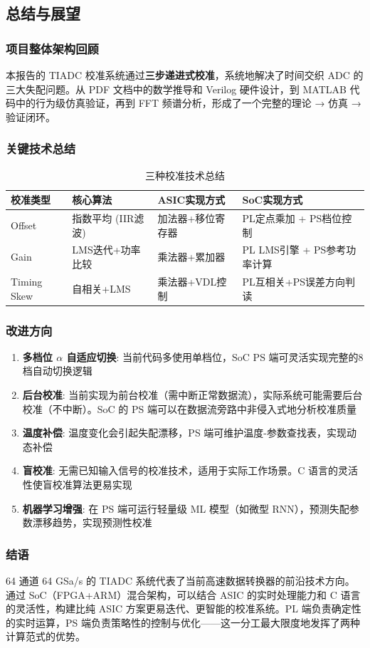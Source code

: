 \documentclass[UTF8,a4paper,11pt]{ctexart}
\begin{document}
\subsection{总结与展望}
\label{sec:conclusion}

\subsubsection{项目整体架构回顾}

本报告的 TIADC 校准系统通过\textbf{三步递进式校准}，系统地解决了时间交织 ADC 的三大失配问题。从 PDF 文档中的数学推导和 Verilog 硬件设计，到 MATLAB 代码中的行为级仿真验证，再到 FFT 频谱分析，形成了一个完整的理论 → 仿真 → 验证闭环。

\subsubsection{关键技术总结}

\begin{table}[ht]
\centering
\caption{三种校准技术总结}
\begin{tabular}{p{2cm}p{2.5cm}p{2.5cm}p{3.5cm}}
\toprule
\textbf{校准类型} & \textbf{核心算法} & \textbf{ASIC实现方式} & \textbf{SoC实现方式} \\
\midrule
Offset & 指数平均 (IIR滤波) & 加法器+移位寄存器 & PL定点乘加 + PS档位控制 \\
Gain & LMS迭代+功率比较 & 乘法器+累加器 & PL LMS引擎 + PS参考功率计算 \\
Timing Skew & 自相关+LMS & 乘法器+VDL控制 & PL互相关+PS误差方向判读 \\
\bottomrule
\end{tabular}
\end{table}

\subsubsection{改进方向}

\begin{enumerate}
    \item \textbf{多档位 $\alpha$ 自适应切换}: 当前代码多使用单档位，SoC PS 端可灵活实现完整的8档自动切换逻辑
    \item \textbf{后台校准}: 当前实现为前台校准（需中断正常数据流），实际系统可能需要后台校准（不中断）。SoC 的 PS 端可以在数据流旁路中非侵入式地分析校准质量
    \item \textbf{温度补偿}: 温度变化会引起失配漂移，PS 端可维护温度-参数查找表，实现动态补偿
    \item \textbf{盲校准}: 无需已知输入信号的校准技术，适用于实际工作场景。C 语言的灵活性使盲校准算法更易实现
    \item \textbf{机器学习增强}: 在 PS 端可运行轻量级 ML 模型（如微型 RNN），预测失配参数漂移趋势，实现预测性校准
\end{enumerate}

\subsubsection{结语}

64 通道 64 GSa/s 的 TIADC 系统代表了当前高速数据转换器的前沿技术方向。通过 SoC（FPGA+ARM）混合架构，可以结合 ASIC 的实时处理能力和 C 语言的灵活性，构建比纯 ASIC 方案更易迭代、更智能的校准系统。PL 端负责确定性的实时运算，PS 端负责策略性的控制与优化——这一分工最大限度地发挥了两种计算范式的优势。
\end{document}
